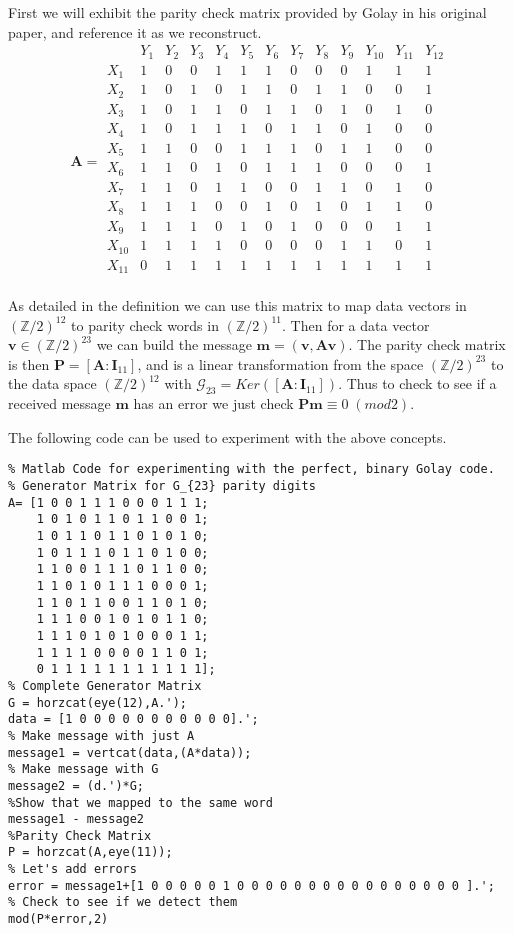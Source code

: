\documentclass[paper=a4, fontsize=11pt]{scrartcl} %
\numberwithin{equation}{section} %
\numberwithin{figure}{section} %
\numberwithin{table}{section} %
\theoremstyle{break}
\begin{document}
First we will exhibit the parity check matrix provided by Golay in his original paper, and reference it as we reconstruct.
$$\textbf{A} = \begin{array}{ccccccccccccc}
& Y_1 & Y_2 & Y_3 & Y_4 & Y_5 & Y_6 & Y_7 & Y_8 & Y_9 & Y_{10} & Y_{11} & Y_{12} \\
   X_1 & 1 & 0 & 0 & 1 & 1 & 1 & 0 & 0 & 0 & 1 & 1 & 1\\
   X_2 & 1 & 0 & 1 & 0 & 1 & 1 & 0 & 1 & 1 & 0 & 0 & 1\\
   X_3 & 1 & 0 & 1 & 1 & 0 & 1 & 1 & 0 & 1 & 0 & 1 & 0\\
   X_4 & 1 & 0 & 1 & 1 & 1 & 0 & 1 & 1 & 0 & 1 & 0 & 0\\
   X_5 & 1 & 1 & 0 & 0 & 1 & 1 & 1 & 0 & 1 & 1 & 0 & 0\\
   X_6 & 1 & 1 & 0 & 1 & 0 & 1 & 1 & 1 & 0 & 0 & 0 & 1\\
   X_7 & 1 & 1 & 0 & 1 & 1 & 0 & 0 & 1 & 1 & 0 & 1 & 0\\
   X_8 & 1 & 1 & 1 & 0 & 0 & 1 & 0 & 1 & 0 & 1 & 1 & 0\\
   X_9 & 1 & 1 & 1 & 0 & 1 & 0 & 1 & 0 & 0 & 0 & 1 & 1\\
X_{10} & 1 & 1 & 1 & 1 & 0 & 0 & 0 & 0 & 1 & 1 & 0 & 1\\
X_{11} & 0 & 1 & 1 & 1 & 1 & 1 & 1 & 1 & 1 & 1 & 1 & 1\\
\end{array}$$

As detailed in the definition we can use this matrix to map data vectors in $(\mathbb{Z}/2)^{12}$ to parity check words in $(\mathbb{Z}/2)^{11}$. Then for a data vector $\mathbf{v} \in (\mathbb{Z}/2)^{23}$ we can build the message $\mathbf{m} = (\mathbf{v},\mathbf{A}\mathbf{v})$. The parity check matrix is then $\textbf{P} = [\mathbf{A}:\mathbf{I}_{11}]$, and is a linear transformation from the space $(\mathbb{Z}/2)^{23}$ to the data space $(\mathbb{Z}/2)^{12}$ with  $\mathcal{G}_{23}=Ker([\mathbf{A}:\mathbf{I}_{11}])$. Thus to check to see if a received message $\mathbf{m}$ has an error we just check $\mathbf{Pm} \equiv 0 \; (mod 2)$.

The following code can be used to experiment with the above concepts.
\begin{lstlisting}
% Matlab Code for experimenting with the perfect, binary Golay code.
% Generator Matrix for G_{23} parity digits
A= [1 0 0 1 1 1 0 0 0 1 1 1;
    1 0 1 0 1 1 0 1 1 0 0 1;
    1 0 1 1 0 1 1 0 1 0 1 0;
    1 0 1 1 1 0 1 1 0 1 0 0;
    1 1 0 0 1 1 1 0 1 1 0 0;
    1 1 0 1 0 1 1 1 0 0 0 1;
    1 1 0 1 1 0 0 1 1 0 1 0;
    1 1 1 0 0 1 0 1 0 1 1 0;
    1 1 1 0 1 0 1 0 0 0 1 1;
    1 1 1 1 0 0 0 0 1 1 0 1;
    0 1 1 1 1 1 1 1 1 1 1 1];
% Complete Generator Matrix
G = horzcat(eye(12),A.');
data = [1 0 0 0 0 0 0 0 0 0 0 0].';
% Make message with just A
message1 = vertcat(data,(A*data));
% Make message with G
message2 = (d.')*G;
%Show that we mapped to the same word
message1 - message2
%Parity Check Matrix
P = horzcat(A,eye(11));
% Let's add errors
error = message1+[1 0 0 0 0 0 1 0 0 0 0 0 0 0 0 0 0 0 0 0 0 0 0 ].';
% Check to see if we detect them
mod(P*error,2)
\end{lstlisting}
\end{document}
